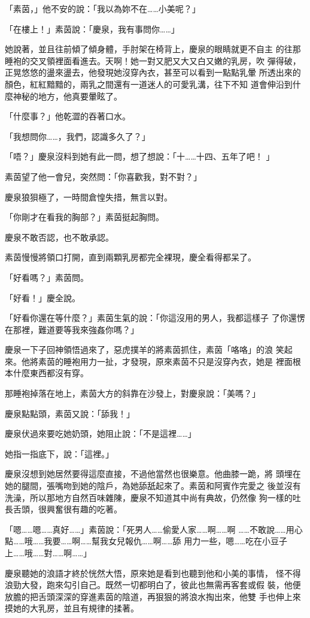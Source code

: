 「素茵，」他不安的說：「我以為妳不在……小美呢？」

「在樓上！」素茵說：「慶泉，我有事問你……」

她說著，並且往前傾了傾身體，手肘架在椅背上，慶泉的眼睛就更不自主
的往那睡袍的交叉領裡面看進去。天啊！她一對又肥又大又白又嫩的乳房，吹
彈得破，正晃悠悠的盪來盪去，他發現她沒穿內衣，甚至可以看到一點點乳暈
所透出來的顏色，紅紅黯黯的，兩乳之間還有一道迷人的可愛乳溝，往下不知
道會伸沿到什麼神秘的地方，他真要暈眩了。

「什麼事？」他乾澀的吞著口水。

「我想問你……，我們，認識多久了？」

「唔？」慶泉沒料到她有此一問，想了想說：「十……十四、五年了吧！
」

素茵望了他一會兒，突然問：「你喜歡我，對不對？」

慶泉狼狽極了，一時間倉惶失措，無言以對。

「你剛才在看我的胸部？」素茵挺起胸問。

慶泉不敢否認，也不敢承認。

素茵慢慢將領口打開，直到兩顆乳房都完全裸現，慶全看得都呆了。

「好看嗎？」素茵問。

「好看！」慶全說。

「好看你還在等什麼？」素茵生氣的說：「你這沒用的男人，我都這樣子
了你還愣在那裡，難道要等我來強姦你嗎？」

慶泉一下子回神領悟過來了，惡虎撲羊的將素茵抓住，素茵「咯咯」的浪
笑起來。他將素茵的睡袍用力一扯，才發現，原來素茵不只是沒穿內衣，她是
裡面根本什麼東西都沒有穿。

那睡袍掉落在地上，素茵大方的斜靠在沙發上，對慶泉說：「美嗎？」

慶泉點點頭，素茵又說：「舔我！」

慶泉伏過來要吃她奶頭，她阻止說：「不是這裡……」

她指一指底下，說：「這裡。」

慶泉沒想到她居然要得這麼直接，不過他當然也很樂意。他曲膝一跪，將
頭埋在她的腿間，張嘴吻到她的陰戶，為她舔舐起來了。素茵和阿賓作完愛之
後並沒有洗澡，所以那地方自然百味雜陳，慶泉不知道其中尚有典故，仍然像
狗一樣的吐長舌頭，很興奮很有趣的吃著。

「嗯……嗯……真好……」素茵說：「死男人……偷愛人家……啊……啊
……不敢說……用心點……哦……我要……啊……幫我女兒報仇……啊……舔
用力一些，嗯……吃在小豆子上……哦……對……啊……」

慶泉聽她的浪語才終於恍然大悟，原來她是看到也聽到他和小美的事情，
怪不得浪勁大發，跑來勾引自己。既然一切都明白了，彼此也無需再客套或假
裝，他便放膽的把舌頭深深的穿進素茵的陰道，再狠狠的將浪水掏出來，他雙
手也伸上來摸她的大乳房，並且有規律的揉著。

